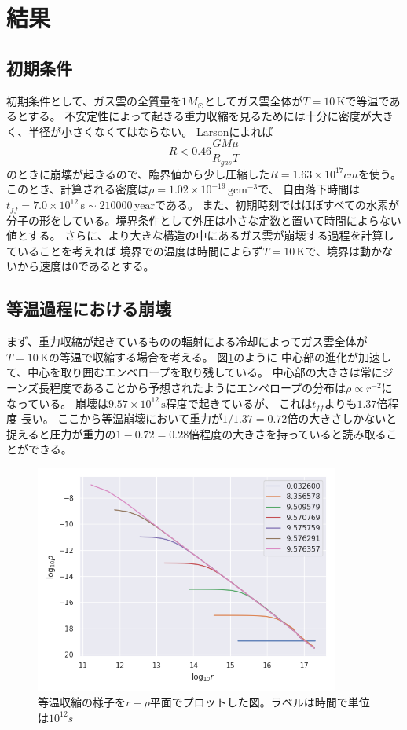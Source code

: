 \documentclass[a4j, dvipdfmx]{jsarticle}
\newcommand{\beq}{\begin{equation}}
\newcommand{\eeq}{\end{equation}}
\begin{document}
\section{結果}
\subsection{初期条件}
初期条件として、ガス雲の全質量を$1M_\odot$としてガス雲全体が$T=10\,\mathrm{K}$で等温であるとする。
不安定性によって起きる重力収縮を見るためには十分に密度が大きく、半径が小さくなくてはならない。
Larson\cite{Larson}によれば
\beq
R < 0.46 \frac{GM\mu}{R_{gas}T}
\eeq
のときに崩壊が起きるので、臨界値から少し圧縮した$R = 1.63 \times 10^{17}cm$を使う。
このとき、計算される密度は$\rho = 1.02 \times 10^{-19}\,\mathrm{gcm^{-3}}$で、
自由落下時間は$t_{ff} = 7.0 \times 10^{12} \,\mathrm{s} \sim 210000 \,\mathrm{year}$である。
また、初期時刻ではほぼすべての水素が分子の形をしている。境界条件として外圧は小さな定数と置いて時間によらない値とする。
さらに、より大きな構造の中にあるガス雲が崩壊する過程を計算していることを考えれば
境界での温度は時間によらず$T=10\,\mathrm{K}$で、境界は動かないから速度は$0$であるとする。
\subsection{等温過程における崩壊}
まず、重力収縮が起きているものの輻射による冷却によってガス雲全体が$T=10\,\mathrm{K}$の等温で収縮する場合を考える。
図\ref{fig:rho_r_iso}のように
中心部の進化が加速して、中心を取り囲むエンベロープを取り残している。
中心部の大きさは常にジーンズ長程度であることから予想されたようにエンベロープの分布は$\rho \propto r^{-2}$になっている。
崩壊は$9.57 \times 10^{12}\,\mathrm{s}$程度で起きているが、
これは$t_{ff}$よりも$1.37$倍程度
長い。
ここから等温崩壊において重力が$1/1.37 = 0.72$倍の大きさしかないと捉えると圧力が重力の$1 - 0.72 =0.28$倍程度の大きさを持っていると読み取ることができる。
\begin{figure}[H]
    \includegraphics[clip,width=10.0cm]{graph/rho_r_iso.png}
    \caption{等温収縮の様子を$r-\rho$平面でプロットした図。ラベルは時間で単位は$10^{12}s$}
    \label{fig:rho_r_iso}
\end{figure}
\end{document}
